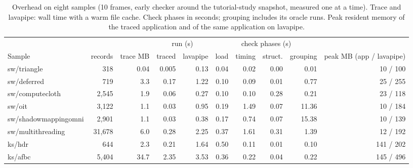 \documentclass[acmtog,anonymous,review]{acmart}
\begin{document}
\begin{table}[t]
\caption{Overhead on eight samples (10 frames, early checker around the tutorial-study snapshot, measured one at a
time). Trace and lavapipe: wall time
with a warm file cache. Check phases in seconds; grouping includes its oracle runs. Peak resident memory of the traced
application and of the same application on lavapipe.}
\label{tab:s-overhead}
\small
\begin{tabular}{@{}lrrrrrrrrr@{}}
\toprule
& & & \multicolumn{2}{c}{run (s)} & \multicolumn{4}{c}{check phases (s)} & \\
\cmidrule(lr){4-5}\cmidrule(lr){6-9}
Sample & records & trace MB & traced & lavapipe & load & timing & struct. & grouping & peak MB (app / lavapipe) \\
\midrule
sw/triangle & 318 & 0.04 & 0.005 & 0.13 & 0.04 & 0.02 & 0.00 & 0.01 & 10 / 100 \\
sw/deferred & 719 & 3.3 & 0.17 & 1.22 & 0.10 & 0.09 & 0.01 & 0.77 & 25 / 255 \\
sw/computecloth & 2,545 & 1.9 & 0.06 & 0.27 & 0.10 & 0.10 & 0.28 & 0.21 & 23 / 118 \\
sw/oit & 3,122 & 1.1 & 0.03 & 0.95 & 0.19 & 1.49 & 0.07 & 11.36 & 10 / 184 \\
sw/shadowmappingomni & 2,901 & 1.1 & 0.03 & 0.38 & 0.17 & 0.74 & 0.07 & 15.38 & 10 / 139 \\
sw/multithreading & 31,678 & 6.0 & 0.28 & 2.25 & 0.37 & 1.61 & 0.31 & 1.39 & 12 / 192 \\
ks/hdr & 644 & 2.3 & 0.21 & 1.64 & 0.50 & 0.11 & 0.01 & 0.10 & 141 / 202 \\
ks/afbc & 5,404 & 34.7 & 2.35 & 3.53 & 0.36 & 0.22 & 0.04 & 0.22 & 145 / 496 \\
\bottomrule
\end{tabular}
\end{table}





\end{document}
